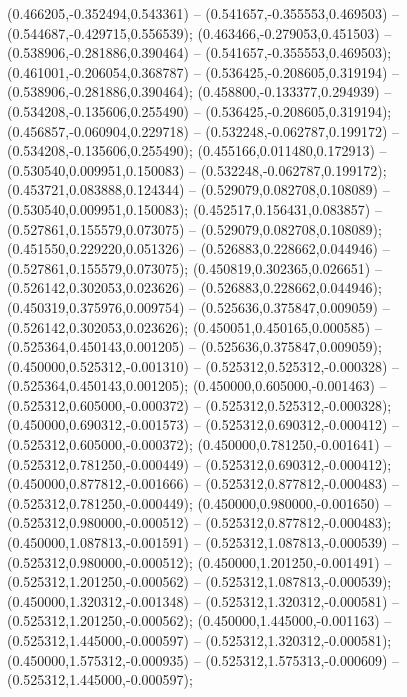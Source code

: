  (0.466205,-0.352494,0.543361) -- (0.541657,-0.355553,0.469503) -- (0.544687,-0.429715,0.556539);
 (0.463466,-0.279053,0.451503) -- (0.538906,-0.281886,0.390464) -- (0.541657,-0.355553,0.469503);
 (0.461001,-0.206054,0.368787) -- (0.536425,-0.208605,0.319194) -- (0.538906,-0.281886,0.390464);
 (0.458800,-0.133377,0.294939) -- (0.534208,-0.135606,0.255490) -- (0.536425,-0.208605,0.319194);
 (0.456857,-0.060904,0.229718) -- (0.532248,-0.062787,0.199172) -- (0.534208,-0.135606,0.255490);
 (0.455166,0.011480,0.172913) -- (0.530540,0.009951,0.150083) -- (0.532248,-0.062787,0.199172);
 (0.453721,0.083888,0.124344) -- (0.529079,0.082708,0.108089) -- (0.530540,0.009951,0.150083);
 (0.452517,0.156431,0.083857) -- (0.527861,0.155579,0.073075) -- (0.529079,0.082708,0.108089);
 (0.451550,0.229220,0.051326) -- (0.526883,0.228662,0.044946) -- (0.527861,0.155579,0.073075);
 (0.450819,0.302365,0.026651) -- (0.526142,0.302053,0.023626) -- (0.526883,0.228662,0.044946);
 (0.450319,0.375976,0.009754) -- (0.525636,0.375847,0.009059) -- (0.526142,0.302053,0.023626);
 (0.450051,0.450165,0.000585) -- (0.525364,0.450143,0.001205) -- (0.525636,0.375847,0.009059);
 (0.450000,0.525312,-0.001310) -- (0.525312,0.525312,-0.000328) -- (0.525364,0.450143,0.001205);
 (0.450000,0.605000,-0.001463) -- (0.525312,0.605000,-0.000372) -- (0.525312,0.525312,-0.000328);
 (0.450000,0.690312,-0.001573) -- (0.525312,0.690312,-0.000412) -- (0.525312,0.605000,-0.000372);
 (0.450000,0.781250,-0.001641) -- (0.525312,0.781250,-0.000449) -- (0.525312,0.690312,-0.000412);
 (0.450000,0.877812,-0.001666) -- (0.525312,0.877812,-0.000483) -- (0.525312,0.781250,-0.000449);
 (0.450000,0.980000,-0.001650) -- (0.525312,0.980000,-0.000512) -- (0.525312,0.877812,-0.000483);
 (0.450000,1.087813,-0.001591) -- (0.525312,1.087813,-0.000539) -- (0.525312,0.980000,-0.000512);
 (0.450000,1.201250,-0.001491) -- (0.525312,1.201250,-0.000562) -- (0.525312,1.087813,-0.000539);
 (0.450000,1.320312,-0.001348) -- (0.525312,1.320312,-0.000581) -- (0.525312,1.201250,-0.000562);
 (0.450000,1.445000,-0.001163) -- (0.525312,1.445000,-0.000597) -- (0.525312,1.320312,-0.000581);
 (0.450000,1.575312,-0.000935) -- (0.525312,1.575313,-0.000609) -- (0.525312,1.445000,-0.000597);
